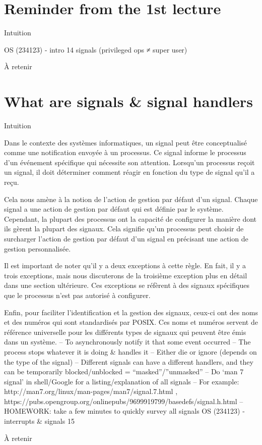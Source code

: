 \documentclass[12pt]{article}
\begin{document}
\section{Reminder from the 1st lecture}
\begin{myvulga}{Intuition}
\end{myvulga}
OS (234123) - intro
14
signals
(privileged ops ≠
super user)
\begin{aretenir}{À retenir}
\end{aretenir}

\section{What are signals \& signal handlers }
\begin{myvulga}{Intuition}
\end{myvulga}
Dans le contexte des systèmes informatiques, un signal peut être conceptualisé comme une notification envoyée à un processus. Ce signal informe le processus d'un événement spécifique qui nécessite son attention. Lorsqu'un processus reçoit un signal, il doit déterminer comment réagir en fonction du type de signal qu'il a reçu. 

Cela nous amène à la notion de l'action de gestion par défaut d'un signal. Chaque signal a une action de gestion par défaut qui est définie par le système. Cependant, la plupart des processus ont la capacité de configurer la manière dont ils gèrent la plupart des signaux. Cela signifie qu'un processus peut choisir de surcharger l'action de gestion par défaut d'un signal en précisant une action de gestion personnalisée.

Il est important de noter qu'il y a deux exceptions à cette règle. En fait, il y a trois exceptions, mais nous discuterons de la troisième exception plus en détail dans une section ultérieure. Ces exceptions se réfèrent à des signaux spécifiques que le processus n'est pas autorisé à configurer. 

Enfin, pour faciliter l'identification et la gestion des signaux, ceux-ci ont des noms et des numéros qui sont standardisés par POSIX. Ces noms et numéros servent de référence universelle pour les différents types de signaux qui peuvent être émis dans un système.
– To asynchronously notify it that some event occurred
– The process stops whatever it is doing \& handles it
– Either die or ignore (depends on the type of the signal)
– Different signals can have a different handlers,
and they can be temporarily blocked/unblocked = “masked”/”unmasked”
– Do ‘man 7 signal’ in shell/Google for a listing/explanation of all signals
– For example: http://man7.org/linux/man-pages/man7/signal.7.html ,
https://pubs.opengroup.org/onlinepubs/9699919799/basedefs/signal.h.html
– HOMEWORK: take a few minutes to quickly survey all signals
OS (234123) - interrupts \& signals
15
\begin{aretenir}{À retenir}
\end{aretenir}
\end{document}
